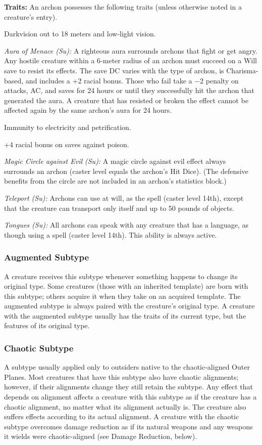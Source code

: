 \textbf{Traits:} An archon possesses the following traits (unless otherwise noted in a creature's entry).
\begin{itemize*}
\item Darkvision out to 18 meters and low-light vision.
\item \textit{Aura of Menace (Su):} A righteous aura surrounds archons that fight or get angry. Any hostile creature within a 6-meter radius of an archon must succeed on a Will save to resist its effects. The save DC varies with the type of archon, is Charisma-based, and includes a +2 racial bonus. Those who fail take a $-2$ penalty on attacks, AC, and saves for 24 hours or until they successfully hit the archon that generated the aura. A creature that has resisted or broken the effect cannot be affected again by the same archon's aura for 24 hours.
\item Immunity to electricity and petrification.
\item +4 racial bonus on saves against poison.
\item \textit{Magic Circle against Evil (Su):} A magic circle against evil effect always surrounds an archon (caster level equals the archon's Hit Dice). (The defensive benefits from the circle are not included in an archon's statistics block.)
\item \textit{Teleport (Su):} Archons can use  at will, as the spell (caster level 14th), except that the creature can transport only itself and up to 50 pounds of objects.
\item \textit{Tongues (Su):} All archons can speak with any creature that has a language, as though using a  spell (caster level 14th). This ability is always active.
\end{itemize*}

\subsubsection{Augmented Subtype}
A creature receives this subtype whenever something happens to change its original type. Some creatures (those with an inherited template) are born with this subtype; others acquire it when they take on an acquired template. The augmented subtype is always paired with the creature's original type. A creature with the augmented subtype usually has the traits of its current type, but the features of its original type.

\subsubsection{Chaotic Subtype}
A subtype usually applied only to outsiders native to the chaotic-aligned Outer Planes. Most creatures that have this subtype also have chaotic alignments; however, if their alignments change they still retain the subtype. Any effect that depends on alignment affects a creature with this subtype as if the creature has a chaotic alignment, no matter what its alignment actually is. The creature also suffers effects according to its actual alignment. A creature with the chaotic subtype overcomes damage reduction as if its natural weapons and any weapons it wields were chaotic-aligned (see Damage Reduction, below).

